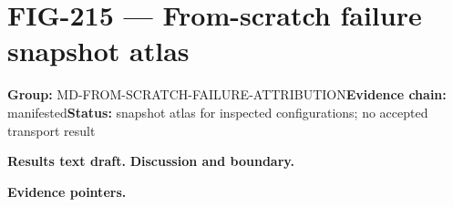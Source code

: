 \clearpage
\section{FIG-215 --- From-scratch failure snapshot atlas}
\label{figpage:fig-215}
\textbf{Group:} MD-FROM-SCRATCH-FAILURE-ATTRIBUTION\quad \textbf{Evidence chain:} manifested\quad \textbf{Status:} snapshot atlas for inspected configurations; no accepted transport result

\textbf{Results text draft.} 
\textbf{Discussion and boundary.} 


\textbf{Evidence pointers.}



\vfill

